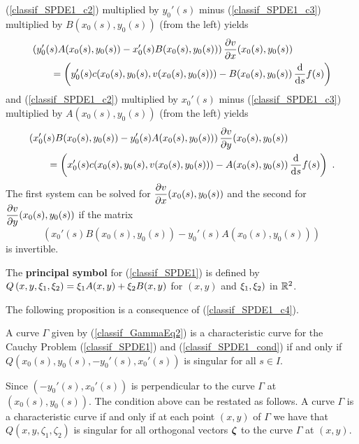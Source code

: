 (\ref{classif_SPDE1_c2}) multiplied by $y_0'(s)$ minus
(\ref{classif_SPDE1_c3}) multiplied by $B(x_0(s),y_0(s))$ (from the
left) yields
\begin{align*}
& \left( y_0'(s)A(x_0(s),y_0(s)) - x_0'(s)B(x_0(s),y_0(s)) \right)
\pdydx{v}{x}(x_0(s),y_0(s)) \\
&\qquad = \left( y_0'(s) c(x_0(s),y_0(s),v(x_0(s),y_0(s)))
- B(x_0(s),y_0(s))\,\dfdx{f}{s}(s)\right)
\end{align*}
and (\ref{classif_SPDE1_c2}) multiplied by $x_0'(s)$ minus
(\ref{classif_SPDE1_c3}) multiplied by $A(x_0(s),y_0(s))$ (from the
left) yields
\begin{align*}
&\left( x_0'(s)B(x_0(s),y_0(s)) - y_0'(s)A(x_0(s),y_0(s)) \right)
\pdydx{v}{y}(x_0(s),y_0(s)) \\
&\qquad = \left( x_0'(s) c(x_0(s),y_0(s),v(x_0(s),y_0(s)))
- A(x_0(s),y_0(s))\,\dfdx{f}{s}(s)\right) \ .
\end{align*}
The first system can be solved for
$\DS \pdydx{v}{x}(x_0(s),y_0(s))$ and the second for
$\DS \pdydx{v}{y}(x_0(s),y_0(s))$ if the matrix
\begin{equation} \label{classif_SPDE1_c4}
\left( x_0'(s)B(x_0(s),y_0(s)) - y_0'(s)A(x_0(s),y_0(s)) \right)
\end{equation}
is invertible.

\begin{defn}
The {\bfseries principal symbol} for
(\ref{classif_SPDE1}) is defined by
$\DS
Q\left(x,y,\xi_1, \xi_2\right) = \xi_1 A(x,y) + \xi_2 B(x,y)$
for $(x,y)$ and $\DS \xi_1,\xi_2)$ in $\RR^2$.
\end{defn}

The following proposition is a consequence of (\ref{classif_SPDE1_c4}).

\begin{prop}
A curve $\Gamma$ given by (\ref{classif_GammaEq2}) is a characteristic
curve for the Cauchy Problem (\ref{classif_SPDE1}) and
(\ref{classif_SPDE1_cond}) if and only if
$Q(x_0(s),y_0(s), -y_0'(s) , x_0'(s))$
is singular for all $s \in I$.
\end{prop}

Since $(-y_0'(s) , x_0'(s))$ is perpendicular to the curve $\Gamma$ at
$(x_0(s), y_0(s))$.  The condition above can be restated as follows.
A curve $\Gamma$ is a characteristic curve if and only if
at each point $(x,y)$ of $\Gamma$ we have that
$Q(x,y, \zeta_1 , \zeta_2)$ is singular for all orthogonal vectors
$\VEC{\zeta}$ to the curve $\Gamma$ at $(x,y)$.

